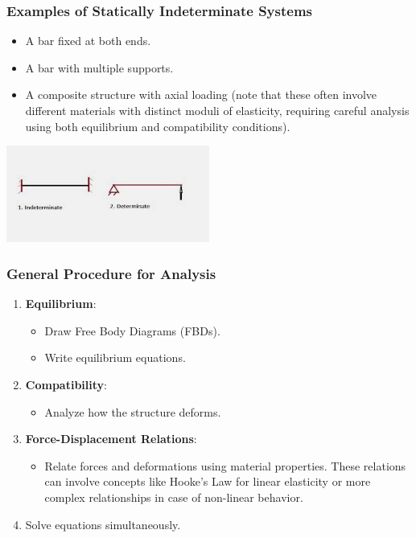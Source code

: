 \documentclass{beamer}
\begin{document}
\begin{frame}
    \frametitle{Examples of Statically Indeterminate Systems}
    \begin{itemize}
        \item A bar fixed at both ends.
        \item A bar with multiple supports.
        \item A composite structure with axial loading (note that these often involve different materials with distinct moduli of elasticity, requiring careful analysis using both equilibrium and compatibility conditions).
    \end{itemize}
    \includegraphics[width=0.5\textwidth]{download.jpg}
\end{frame}

\begin{frame}
    \frametitle{General Procedure for Analysis}
    \begin{enumerate}
        \item \textbf{Equilibrium}: 
            \begin{itemize}
                \item Draw Free Body Diagrams (FBDs).
                \item Write equilibrium equations.
            \end{itemize}
        \item \textbf{Compatibility}: 
            \begin{itemize}
                \item Analyze how the structure deforms.
            \end{itemize}
        \item \textbf{Force-Displacement Relations}: 
            \begin{itemize}
                \item Relate forces and deformations using material properties. These relations can involve concepts like Hooke's Law for linear elasticity or more complex relationships in case of non-linear behavior.
            \end{itemize}
        \item Solve equations simultaneously.
    \end{enumerate}
\end{frame}
\end{document}
